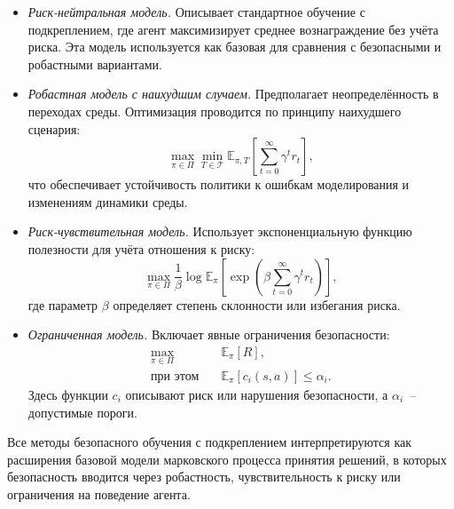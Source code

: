 \begin{itemize}

    \item \emph{Риск-нейтральная модель.}  
    Описывает стандартное обучение с подкреплением, где агент максимизирует среднее вознаграждение без учёта риска.  
    Эта модель используется как базовая для сравнения с безопасными и робастными вариантами.

    \item \emph{Робастная модель с наихудшим случаем.}  
    Предполагает неопределённость в переходах среды.  
    Оптимизация проводится по принципу наихудшего сценария:
    \begin{equation}
    \max_{\pi \in \Pi} \min_{T \in \mathcal{T}} \mathbb{E}_{\pi,T}\left[\sum_{t=0}^{\infty} \gamma^t r_t \right],
    \end{equation}
    что обеспечивает устойчивость политики к ошибкам моделирования и изменениям динамики среды.

    \item \emph{Риск-чувствительная модель.}  
    Использует экспоненциальную функцию полезности для учёта отношения к риску:
    \begin{equation}
    \max_{\pi \in \Pi} \frac{1}{\beta} \log \mathbb{E}_{\pi}\left[\exp\left(\beta \sum_{t=0}^{\infty} \gamma^t r_t\right)\right],
    \end{equation}
    где параметр $\beta$ определяет степень склонности или избегания риска.

    \item \emph{Ограниченная модель.}  
    Включает явные ограничения безопасности:
    \begin{equation}
    \begin{aligned}
    \max_{\pi \in \Pi} & \quad \mathbb{E}_{\pi}[R], \\
    \text{при этом} & \quad \mathbb{E}_{\pi}[c_i(s,a)] \leq \alpha_i.
    \end{aligned}
    \end{equation}
    Здесь функции $c_i$ описывают риск или нарушения безопасности, а $\alpha_i$~-- допустимые пороги.

\end{itemize}

Все методы безопасного обучения с подкреплением интерпретируются как расширения базовой модели марковского процесса принятия решений, в которых безопасность вводится через робастность, чувствительность к риску или ограничения на поведение агента.
